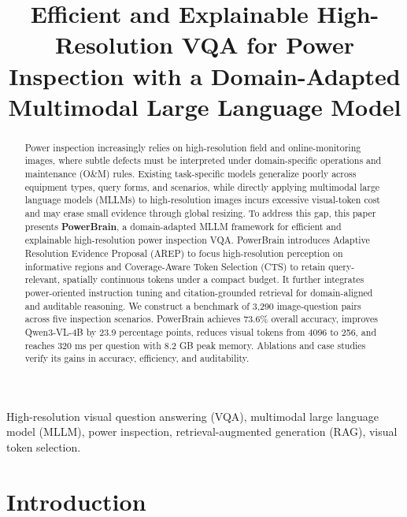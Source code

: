 \documentclass[journal,twoside,web]{ieeecolor}
\begin{document}
\title{Efficient and Explainable High-Resolution VQA for Power Inspection with a Domain-Adapted Multimodal Large Language Model}
\author{}

\maketitle

\begin{abstract}
  Power inspection increasingly relies on high-resolution field and online-monitoring images, where subtle defects must be interpreted under domain-specific operations and maintenance (O\&M) rules.
  Existing task-specific models generalize poorly across equipment types, query forms, and scenarios, while directly applying multimodal large language models (MLLMs) to high-resolution images incurs excessive visual-token cost and may erase small evidence through global resizing.
  To address this gap, this paper presents \textbf{PowerBrain}, a domain-adapted MLLM framework for efficient and explainable high-resolution power inspection VQA.
  PowerBrain introduces Adaptive Resolution Evidence Proposal (AREP) to focus high-resolution perception on informative regions and Coverage-Aware Token Selection (CTS) to retain query-relevant, spatially continuous tokens under a compact budget.
  It further integrates power-oriented instruction tuning and citation-grounded retrieval for domain-aligned and auditable reasoning.
  We construct a benchmark of 3,290 image-question pairs across five inspection scenarios.
  PowerBrain achieves 73.6\% overall accuracy, improves Qwen3-VL-4B by 23.9 percentage points, reduces visual tokens from 4096 to 256, and reaches 320 ms per question with 8.2 GB peak memory.
  Ablations and case studies verify its gains in accuracy, efficiency, and auditability.
\end{abstract}

\begin{IEEEkeywords}
  High-resolution visual question answering (VQA), multimodal large language model (MLLM), power inspection, retrieval-augmented generation (RAG), visual token selection.
\end{IEEEkeywords}

\section{Introduction}
\label{sec:introduction}
\end{document}
